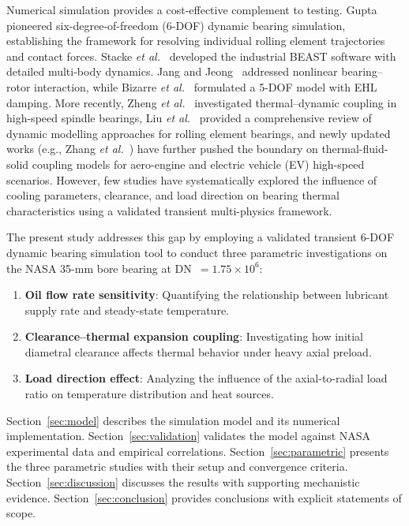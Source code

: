 \documentclass[applsci,article,submit,pdftex,moreauthors]{Definitions/mdpi}
\begin{document}
Numerical simulation provides a cost-effective complement to testing. Gupta~\cite{Gupta1984} pioneered six-degree-of-freedom (6-DOF) dynamic bearing simulation, establishing the framework for resolving individual rolling element trajectories and contact forces. Stacke \textit{et al.}~\cite{Stacke1999} developed the industrial BEAST software with detailed multi-body dynamics. Jang and Jeong~\cite{Jang2004} addressed nonlinear bearing--rotor interaction, while Bizarre \textit{et al.}~\cite{Bizarre2018} formulated a 5-DOF model with EHL damping. More recently, Zheng \textit{et al.}~\cite{Zheng2018} investigated thermal--dynamic coupling in high-speed spindle bearings, Liu \textit{et al.}~\cite{Liu2020} provided a comprehensive review of dynamic modelling approaches for rolling element bearings, and newly updated works (e.g., Zhang \textit{et al.}~\cite{Zhang2024}) have further pushed the boundary on thermal-fluid-solid coupling models for aero-engine and electric vehicle (EV) high-speed scenarios. However, few studies have systematically explored the influence of cooling parameters, clearance, and load direction on bearing thermal characteristics using a validated transient multi-physics framework.

The present study addresses this gap by employing a validated transient 6-DOF dynamic bearing simulation tool to conduct three parametric investigations on the NASA 35-mm bore bearing at DN~$= 1.75 \times 10^6$:
\begin{enumerate}
    \item \textbf{Oil flow rate sensitivity}: Quantifying the relationship between lubricant supply rate and steady-state temperature.
    \item \textbf{Clearance--thermal expansion coupling}: Investigating how initial diametral clearance affects thermal behavior under heavy axial preload.
    \item \textbf{Load direction effect}: Analyzing the influence of the axial-to-radial load ratio on temperature distribution and heat sources.
\end{enumerate}

Section~\ref{sec:model} describes the simulation model and its numerical implementation. Section~\ref{sec:validation} validates the model against NASA experimental data and empirical correlations. Section~\ref{sec:parametric} presents the three parametric studies with their setup and convergence criteria. Section~\ref{sec:discussion} discusses the results with supporting mechanistic evidence. Section~\ref{sec:conclusion} provides conclusions with explicit statements of scope.
\end{document}

